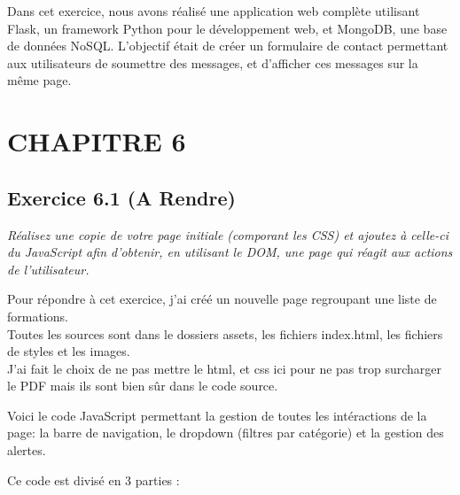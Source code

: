 \documentclass[a4paper,11pt]{article}
\begin{document}
                \begin{tcolorbox}[colback=lightgray!6, colframe=black, left=2mm, right=5mm, top=2mm, bottom=2mm, boxrule=0.1mm]
                    Dans cet exercice, nous avons réalisé une application web complète utilisant Flask, un framework Python pour le développement web, 
                    et MongoDB, une base de données NoSQL. L'objectif était de créer un formulaire de contact permettant aux utilisateurs de soumettre des messages, 
                    et d'afficher ces messages sur la même page.
                \end{tcolorbox}
    \newpage
    \section{CHAPITRE 6}
        \subsection{Exercice 6.1 (A Rendre)}
            \noindent \textit{Réalisez une copie de votre page initiale (comporant les CSS)
            et ajoutez à celle-ci du JavaScript afin d’obtenir, en utilisant le DOM,
            une page qui réagit aux actions de l’utilisateur.}
            
            \bigskip
            \noindent Pour répondre à cet exercice, j'ai créé un nouvelle page regroupant 
            une liste de formations.\\ Toutes les sources sont dans le dossiers assets, les fichiers index.html, les fichiers de styles et les images.\\
            J'ai fait le choix de ne pas mettre le html, et css ici pour ne pas trop surcharger le PDF mais 
            ils sont bien sûr dans le code source.

            \bigskip
            \noindent Voici le code JavaScript permettant la gestion de toutes les intéractions de la page:
            la barre de navigation, le dropdown (filtres par catégorie) et la gestion des alertes. 
            
            

            \noindent Ce code est divisé en 3 parties :
\end{document}
